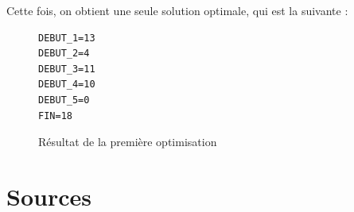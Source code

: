 \documentclass{latexPackage/utc-report/utc-report}
\begin{document}
Cette fois, on obtient une seule solution optimale, qui est la suivante :

\begin{figure}[h!]
    \begin{verbatim}
DEBUT_1=13
DEBUT_2=4
DEBUT_3=11
DEBUT_4=10
DEBUT_5=0
FIN=18
    \end{verbatim}
    \caption{Résultat de la première optimisation}
\end{figure}

\pagebreak

\section{Sources}

\pagebreak

\listoffigures
\end{document}
